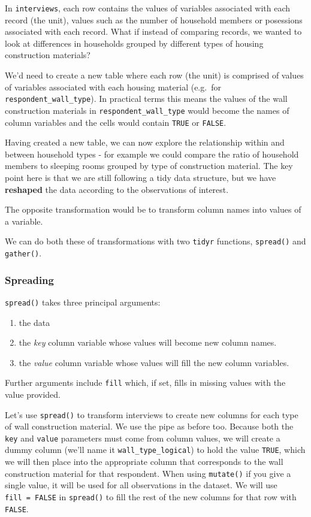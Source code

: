 \documentclass[]{book}
\providecommand{\tightlist}{%
  \setlength{\itemsep}{0pt}\setlength{\parskip}{0pt}}
\begin{document}
In \texttt{interviews}, each row contains the values of variables
associated with each record (the unit), values such as the number of
household members or posessions associated with each record. What if
instead of comparing records, we wanted to look at differences in
households grouped by different types of housing construction materials?

We'd need to create a new table where each row (the unit) is comprised
of values of variables associated with each housing material (e.g.~for
\texttt{respondent\_wall\_type}). In practical terms this means the
values of the wall construction materials in
\texttt{respondent\_wall\_type} would become the names of column
variables and the cells would contain \texttt{TRUE} or \texttt{FALSE}.

Having created a new table, we can now explore the relationship within
and between household types - for example we could compare the ratio of
household members to sleeping rooms grouped by type of construction
material. The key point here is that we are still following a tidy data
structure, but we have \textbf{reshaped} the data according to the
observations of interest.

The opposite transformation would be to transform column names into
values of a variable.

We can do both these of transformations with two \texttt{tidyr}
functions, \texttt{spread()} and \texttt{gather()}.

\subsubsection{Spreading}\label{spreading}

\texttt{spread()} takes three principal arguments:

\begin{enumerate}
\def\labelenumi{\arabic{enumi}.}
\tightlist
\item
  the data
\item
  the \emph{key} column variable whose values will become new column
  names.
\item
  the \emph{value} column variable whose values will fill the new column
  variables.
\end{enumerate}

Further arguments include \texttt{fill} which, if set, fills in missing
values with the value provided.

Let's use \texttt{spread()} to transform interviews to create new
columns for each type of wall construction material. We use the pipe as
before too. Because both the \texttt{key} and \texttt{value} parameters
must come from column values, we will create a dummy column (we'll name
it \texttt{wall\_type\_logical}) to hold the value \texttt{TRUE}, which
we will then place into the appropriate column that corresponds to the
wall construction material for that respondent. When using
\texttt{mutate()} if you give a single value, it will be used for all
observations in the dataset. We will use \texttt{fill\ =\ FALSE} in
\texttt{spread()} to fill the rest of the new columns for that row with
\texttt{FALSE}.
\end{document}
